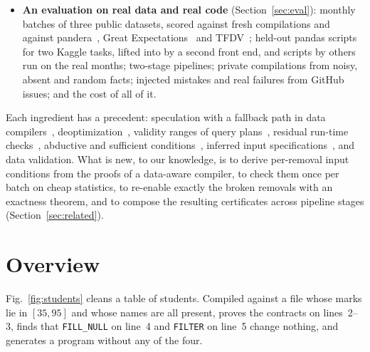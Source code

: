 \begin{itemize}
person's contribution. The data owner
releases one Laplace histogram per column over those cells; everything the compiler writes is $\varepsilon$-differentially private for a
declared schema, and with probability $1-\beta$ every ``likely violated'' warning is true and every
released fact is false by few rows. At equal budget these program-chosen cells keep more of the normal
compilation's removals than fixed bins and give a program where synthetic data compiled normally reports
contracts as violated that the data satisfies; given the same cells and threshold, HDMM and AIM do no
better on any workload, and AIM's synthetic data loses removals and warns about contracts the data
satisfies
(Section~\ref{sec:rq-private}).
\item \textbf{An evaluation on real data and real code} (Section~\ref{sec:eval}): \RealRuns{}
monthly batches of three public datasets, scored against fresh compilations and against
pandera~\cite{bantilan2020}, Great Expectations~\cite{gx} and TFDV~\cite{breck2019}; \CorpusBothLifted{}
held-out pandas scripts for two Kaggle tasks, lifted into \PL by a second front end, and
\DriftCompiled{} scripts by others run on the real months; two-stage
pipelines; private compilations from noisy, absent and random facts; injected mistakes and
\RbTotal{} real failures from GitHub issues; and the cost of all of it.
\end{itemize}

Each ingredient has a precedent: speculation with a fallback path in data
compilers~\cite{spiegelberg2021,schiavio2020}, deoptimization~\cite{holzle1992,flueckiger2018},
validity ranges of query plans~\cite{markl2004}, residual run-time checks~\cite{stulova2018},
abductive and sufficient conditions~\cite{dillig2012,mine2014}, inferred input
specifications~\cite{urban2020}, and data validation. What is new, to our knowledge, is to derive
per-removal input conditions from the proofs of a data-aware compiler, to check them once per batch
on cheap statistics, to re-enable exactly the broken removals with an exactness theorem, and to
compose the resulting certificates across pipeline stages (Section~\ref{sec:related}).

\section{Overview}\label{sec:overview}



Fig.~\ref{fig:students} cleans a table of students. Compiled against a file whose marks lie in
$[35,95]$ and whose names are all present, \PL proves the contracts on lines~2--3, finds that
\texttt{FILL\_NULL} on line~4 and \texttt{FILTER} on line~5 change nothing, and generates a program
without any of the four.

